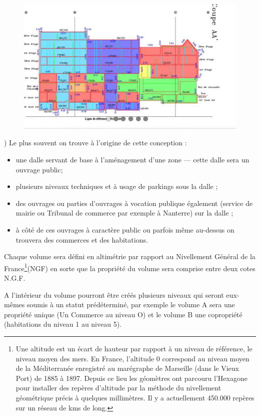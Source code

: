 				\begin{figure}[h]
					\centering
					\includegraphics[width=0.7\linewidth]{images/volumetrieCoupe}
					\caption[Exemple : Urbanisme sur Dalle (Nanterre)]{}
					\label{fig:volumetriecoupe}
				\end{figure}
				)
				Le plus souvent on trouve à l’origine de cette conception :
				\begin{itemize}
					\item une dalle servant de base à l'aménagement d'une zone --- cette dalle sera un ouvrage public;
					\item  plusieurs niveaux techniques et à usage de parkings sous la dalle ;
					\item des ouvrages ou parties d'ouvrages à vocation publique également (service de mairie
					ou Tribunal de commerce par exemple à Nanterre) sur la dalle ; 
					\item  à côté de ces ouvrages à caractère public ou parfois même au-dessus on trouvera des commerces
					et des habitations.
				\end{itemize}
				
				Chaque volume sera défini en altimétrie par rapport au Nivellement Général de la France\footnote{
				Une altitude est un écart de hauteur par rapport à un niveau de référence, le niveau moyen des mers. En France, l’altitude 0 correspond au niveau moyen de la Méditerranée enregistré au marégraphe de Marseille (dans le Vieux Port) de 1885 à 1897.
				Depuis ce lieu les géomètres ont parcouru l’Hexagone pour installer des repères d’altitude par la méthode du nivellement	géométrique précis à quelques millimètres. Il y a actuellement 450.000 repères sur un réseau de  kms de long.
				}(NGF) en sorte que la propriété du volume sera comprise entre deux cotes N.G.F.
				
				A l'intérieur du volume pourront être créés plusieurs niveaux qui seront eux-mêmes soumis à un statut
				prédéterminé, par exemple le volume A sera une propriété unique (Un Commerce au niveau O) et le
				volume B une copropriété (habitations du niveau 1 au niveau 5).
				
